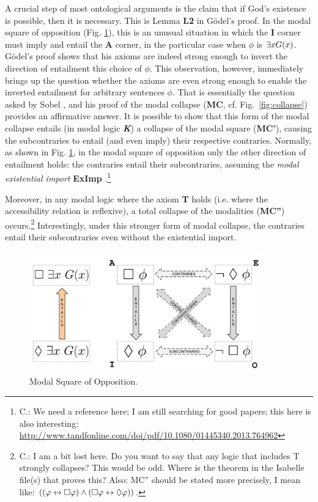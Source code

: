 \documentclass{birkjour}
\theoremstyle{definition}
\theoremstyle{remark}
\numberwithin{equation}{section}
\begin{document}
A crucial step of most ontological arguments is the claim that if
God's existence is possible, then it is necessary.  This is Lemma
\textbf{L2} in G\"odel's proof.  In the modal square of opposition
(Fig. \ref{fig:square}), this is an unusual situation in which the
\textbf{I} corner must imply and entail the \textbf{A} corner, in the
particular case when $\phi$ is $\exists x G(x)$.  G\"odel's proof shows
that his axioms are indeed strong enough to invert the direction of
entailment this choice of $\phi$.
This observation, however, immediately brings up the question whether
the axioms are even strong enough to enable the inverted entailment
for arbitrary sentences $\phi$.  That is essentially the question
asked by Sobel \cite{Sobel1987}, and his proof of the modal collapse
(\textbf{MC}, cf. Fig.~\ref{fig:collapse}) provides an affirmative answer. It is possible to show
that this form of the modal collapse entails (in modal logic
\textbf{\emph{K}}) a collapse of the modal square (\textbf{MC'}),
causing the subcontraries to entail (and even imply) their respective
contraries. Normally, as shown in Fig. \ref{fig:square}, in the modal
square of opposition only the other direction of entailment holds: the
contraries entail their subcontraries, assuming the \emph{modal
  existential import} \textbf{ExImp}
\cite{WhatToCiteHere}.\footnote{C.: We need a reference here; I am still
  searching for good papers; this here is also interesting:
  \url{http://www.tandfonline.com/doi/pdf/10.1080/01445340.2013.764962}}

Moreover, in any modal logic where the axiom \textbf{T} holds
(i.e. where the accessibility relation is reflexive), a total collapse
of the modalities (\textbf{MC''}) occurs.\footnote{C.: I am a bit lost here. Do you want to
  say that any logic that includes T strongly collapses? This would be 
  odd. Where is the theorem in the Isabelle file(s) that proves this? Also: MC'' should
  be stated more precisely, I mean like: $((\varphi \leftrightarrow \Box \varphi) \wedge (\Box \varphi
  \leftrightarrow \Diamond \varphi))$.}  Interestingly, under this stronger form of modal
  collapse, the contraries entail their subcontraries even without the
  existential import.

\begin{figure}[t]
\includegraphics[width=0.9\textwidth]{./SquarePics/ModalSquare.png}
\caption{Modal Square of Opposition.}
\label{fig:square}
\end{figure}
\end{document}
